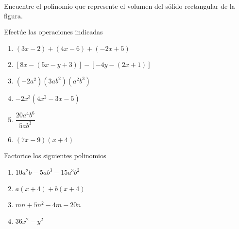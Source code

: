 \documentclass[letterpaper,fleqn]{article}
\begin{document}
\begin{enumerate}
\begin{minipage}{.45\textwidth}
\end{minipage}\noanswer
\begin{minipage}{.45\textwidth}
\item Encuentre el polinomio que represente el volumen del sólido rectangular de la figura.
\end{minipage}\hfill
\begin{minipage}{.45\textwidth}
\end{minipage}
\noanswer
\newpage
\item Efectúe las operaciones indicadas
\begin{enumerate}
\item $(3x-2)+(4x-6)+(-2x+5)$\noanswer
\item $[8x-(5x-y+3)]-[-4y-(2x+1)]$\noanswer
\item $(-2a^{2})(3ab^{2})(a^{2}b^{3})$\noanswer
\item $-2x^{3}(4x^{2}-3x-5)$\noanswer
\item $\dfrac{20a^{4}b^{6}}{5ab^{3}}$\noanswer
\item $(7x-9)(x+4)$\noanswer
\end{enumerate}
\item Factorice los siguientes polinomios
\begin{enumerate}
\item $10a^{2}b-5ab^{3}-15a^{3}b^{2}$\noanswer
\item $a(x+4)+b(x+4)$\noanswer
\item $mn+5n^{2}-4m-20n$\noanswer
\item $36x^{2}-y^{2}$\noanswer
\end{enumerate}
 \end{enumerate}
\end{document}
